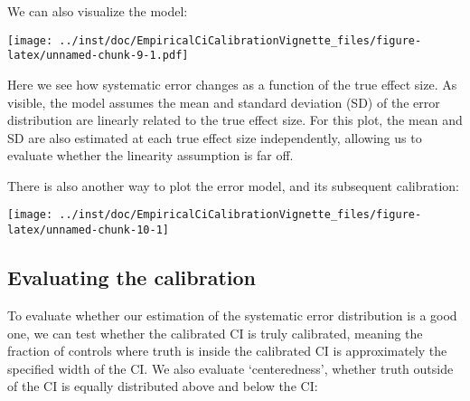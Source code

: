 \documentclass[]{article}
\newenvironment{Shaded}{\begin{snugshade}}{\end{snugshade}}
\newcommand{\DataTypeTok}[1]{\textcolor[rgb]{0.13,0.29,0.53}{#1}}
\newcommand{\KeywordTok}[1]{\textcolor[rgb]{0.13,0.29,0.53}{\textbf{#1}}}
\newcommand{\NormalTok}[1]{#1}
\newcommand{\OperatorTok}[1]{\textcolor[rgb]{0.81,0.36,0.00}{\textbf{#1}}}
\begin{document}
We can also visualize the model:

\begin{Shaded}
\end{Shaded}

\texttt{[image: ../inst/doc/EmpiricalCiCalibrationVignette\_files/figure-latex/unnamed-chunk-9-1.pdf]}

Here we see how systematic error changes as a function of the true
effect size. As visible, the model assumes the mean and standard
deviation (SD) of the error distribution are linearly related to the
true effect size. For this plot, the mean and SD are also estimated at
each true effect size independently, allowing us to evaluate whether the
linearity assumption is far off.

There is also another way to plot the error model, and its subsequent
calibration:

\begin{Shaded}
\end{Shaded}

\texttt{[image: ../inst/doc/EmpiricalCiCalibrationVignette\_files/figure-latex/unnamed-chunk-10-1]}

\hypertarget{evaluating-the-calibration}{%
\subsection{Evaluating the
calibration}\label{evaluating-the-calibration}}

To evaluate whether our estimation of the systematic error distribution
is a good one, we can test whether the calibrated CI is truly
calibrated, meaning the fraction of controls where truth is inside the
calibrated CI is approximately the specified width of the CI. We also
evaluate `centeredness', whether truth outside of the CI is equally
distributed above and below the CI:

\begin{Shaded}
\end{Shaded}
\end{document}
